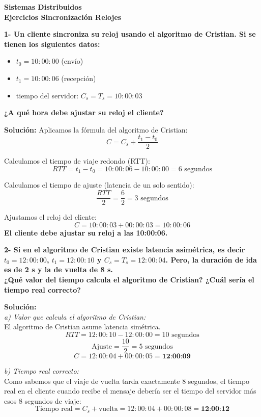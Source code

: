 \documentclass[12pt,a4paper]{article}
\begin{document}
\begin{center}
    \Large \textbf{Sistemas Distribuidos} \\
    \large \textbf{Ejercicios Sincronización Relojes}
\end{center}

\vspace{0.5cm}

\textbf{1- Un cliente sincroniza su reloj usando el algoritmo de Cristian. Si se tienen los siguientes datos:}
\begin{itemize}
    \item $t_0 = 10:00:00$ (envío)
    \item $t_1 = 10:00:06$ (recepción)
    \item tiempo del servidor: $C_s = T_s = 10:00:03$
\end{itemize}
\textbf{¿A qué hora debe ajustar su reloj el cliente?}

\vspace{0.3cm}
\textbf{Solución:}
Aplicamos la fórmula del algoritmo de Cristian: 
$$ C = C_s + \frac{t_1 - t_0}{2} $$

Calculamos el tiempo de viaje redondo (RTT):
$$ RTT = t_1 - t_0 = 10:00:06 - 10:00:00 = 6 \text{ segundos} $$

Calculamos el tiempo de ajuste (latencia de un solo sentido):
$$ \frac{RTT}{2} = \frac{6}{2} = 3 \text{ segundos} $$

Ajustamos el reloj del cliente:
$$ C = 10:00:03 + 00:00:03 = 10:00:06 $$
\textbf{El cliente debe ajustar su reloj a las 10:00:06.}

\vspace{0.8cm}

\textbf{2- Si en el algoritmo de Cristian existe latencia asimétrica, es decir $t_0=12:00:00$, $t_1=12:00:10$ y $C_s=T_s=12:00:04$. Pero, la duración de ida es de 2 s y la de vuelta de 8 s. }\\
\textbf{¿Qué valor del tiempo calcula el algoritmo de Cristian? ¿Cuál sería el tiempo real correcto?}

\vspace{0.3cm}
\textbf{Solución:}
\\
\textit{a) Valor que calcula el algoritmo de Cristian:} \\
El algoritmo de Cristian asume latencia simétrica. 
$$ RTT = 12:00:10 - 12:00:00 = 10 \text{ segundos} $$
$$ \text{Ajuste} = \frac{10}{2} = 5 \text{ segundos} $$
$$ C = 12:00:04 + 00:00:05 = \textbf{12:00:09} $$

\textit{b) Tiempo real correcto:} \\
Como sabemos que el viaje de vuelta tarda exactamente 8 segundos, el tiempo real en el cliente cuando recibe el mensaje debería ser el tiempo del servidor más esos 8 segundos de viaje:
$$ \text{Tiempo real} = C_s + \text{vuelta} = 12:00:04 + 00:00:08 = \textbf{12:00:12} $$
\end{document}
